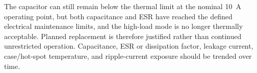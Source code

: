 
\begin{solutionblock}
    The capacitor can still remain below the thermal limit at the nominal
    \SI{10}{\ampere} operating point, but both capacitance and ESR have reached
    the defined electrical maintenance limits, and the high-load mode is no longer
    thermally acceptable. Planned replacement is therefore justified rather than
    continued unrestricted operation. Capacitance, ESR or dissipation factor,
    leakage current, case/hot-spot temperature, and ripple-current exposure should
    be trended over time.
\end{solutionblock}
